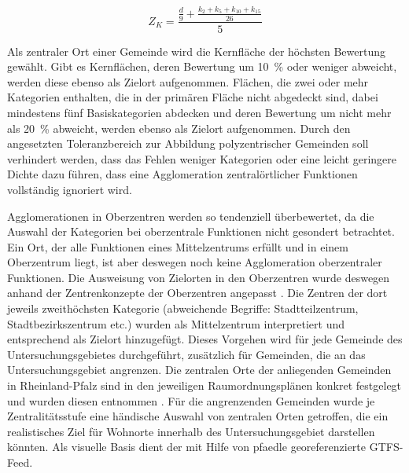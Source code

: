 \documentclass[11pt,pdftex,a4paper]{scrartcl}
\begin{document}
	\begin{equation}
		\label{eq:zentralität}
		Z_K = \frac{\frac{d}{9}+\frac{k_2+k_5+k_{10}+k_{15}}{26}}{5}
	\end{equation}
	
	Als zentraler Ort einer Gemeinde wird die Kernfläche der höchsten Bewertung gewählt. Gibt es Kernflächen, deren Bewertung um \SI{10}{\percent} oder weniger abweicht, werden diese ebenso als Zielort aufgenommen. Flächen, die zwei oder mehr Kategorien enthalten, die in der primären Fläche nicht abgedeckt sind, dabei mindestens fünf Basiskategorien abdecken und deren Bewertung um nicht mehr als \SI{20}{\percent} abweicht, werden ebenso als Zielort aufgenommen. Durch den angesetzten Toleranzbereich zur Abbildung polyzentrischer Gemeinden soll verhindert werden, dass das Fehlen weniger Kategorien oder eine leicht geringere Dichte dazu führen, dass eine Agglomeration zentralörtlicher Funktionen vollständig ignoriert wird. 
	
	Agglomerationen in Oberzentren werden so tendenziell überbewertet, da die Auswahl der Kategorien bei \textcite{Flex2016} oberzentrale Funktionen nicht gesondert betrachtet. Ein Ort, der alle Funktionen eines Mittelzentrums erfüllt und in einem Oberzentrum liegt, ist aber deswegen noch keine Agglomeration oberzentraler Funktionen. Die Ausweisung von Zielorten in den Oberzentren wurde deswegen anhand der Zentrenkonzepte der Oberzentren angepasst \parencites{AachenZentrenUndNahversorgungskonzept2016}{bonnBonnerEinzelhandelsundZentrenKonzept}{duesseldorfRahmenplanEinzelhandel}{stadtkolnEinzelhandelsUndZentrenkonzept2024}{monchengladbachNahversorgungsUndZentrenkonzept2017}. Die Zentren der dort jeweils zweithöchsten Kategorie (abweichende Begriffe: Stadtteilzentrum, Stadtbezirkszentrum etc.) wurden als Mittelzentrum interpretiert und entsprechend als Zielort hinzugefügt. Dieses Vorgehen wird für jede Gemeinde des Untersuchungsgebietes durchgeführt, zusätzlich für Gemeinden, die an das Untersuchungsgebiet angrenzen. Die zentralen Orte der anliegenden Gemeinden in Rheinland-Pfalz sind in den jeweiligen Raumordnungsplänen konkret festgelegt und wurden diesen entnommen \parencites{planungsgemeinschaftmittelrhein-westerwaldWFSRegionalplan2017}[1,2]{planungsgemeinschaftregiontrierRegionalerRaumordnungsplanRegion1985}. Für die angrenzenden Gemeinden wurde je Zentralitätsstufe eine händische Auswahl von zentralen Orten getroffen, die ein realistisches Ziel für Wohnorte innerhalb des Untersuchungsgebiet darstellen könnten. Als visuelle Basis dient der mit Hilfe von pfaedle \parencites{bastSparseMapmatchingPublic2018}{AdfreiburgPfaedle2026} georeferenzierte GTFS-Feed.
	
\end{document}
